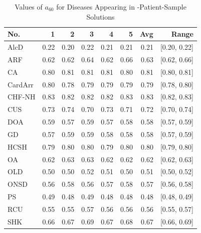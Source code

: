 \begin{table}[htbp]
\centering
\begin{tabular}{l|rrrrrrr}
\toprule
No. & 1 & 2 & 3 & 4 & 5 & Avg & Range \\
\midrule
AlcD    & 0.22 & 0.20 & 0.22 & 0.21 & 0.21 & 0.21 & [0.20, 0.22] \\
ARF     & 0.62 & 0.62 & 0.64 & 0.62 & 0.66 & 0.63 & [0.62, 0.66] \\
CA      & 0.80 & 0.81 & 0.81 & 0.81 & 0.80 & 0.81 & [0.80, 0.81] \\
CardArr & 0.80 & 0.78 & 0.79 & 0.79 & 0.79 & 0.79 & [0.78, 0.80] \\
CHF-NH  & 0.83 & 0.82 & 0.82 & 0.82 & 0.83 & 0.83 & [0.82, 0.83] \\
CUS     & 0.73 & 0.74 & 0.70 & 0.73 & 0.71 & 0.72 & [0.70, 0.74] \\
DOA     & 0.59 & 0.57 & 0.59 & 0.57 & 0.58 & 0.58 & [0.57, 0.59] \\
GD      & 0.57 & 0.59 & 0.59 & 0.58 & 0.58 & 0.58 & [0.57, 0.59] \\
HCSH    & 0.79 & 0.80 & 0.80 & 0.79 & 0.80 & 0.80 & [0.79, 0.80] \\
OA      & 0.62 & 0.63 & 0.63 & 0.62 & 0.62 & 0.62 & [0.62, 0.63] \\
OLD     & 0.50 & 0.50 & 0.52 & 0.51 & 0.50 & 0.51 & [0.50, 0.52] \\
ONSD    & 0.56 & 0.58 & 0.56 & 0.57 & 0.58 & 0.57 & [0.56, 0.58] \\
PS      & 0.49 & 0.48 & 0.49 & 0.48 & 0.48 & 0.48 & [0.48, 0.49] \\
RCU     & 0.55 & 0.55 & 0.57 & 0.56 & 0.56 & 0.56 & [0.55, 0.57] \\
SHK     & 0.66 & 0.67 & 0.69 & 0.67 & 0.68 & 0.67 & [0.66, 0.69] \\
\bottomrule
\end{tabular}
\caption{Values of $a_{60}$ for Diseases Appearing in -Patient-Sample Solutions}
\label{tab.a60_30k}
\end{table}

